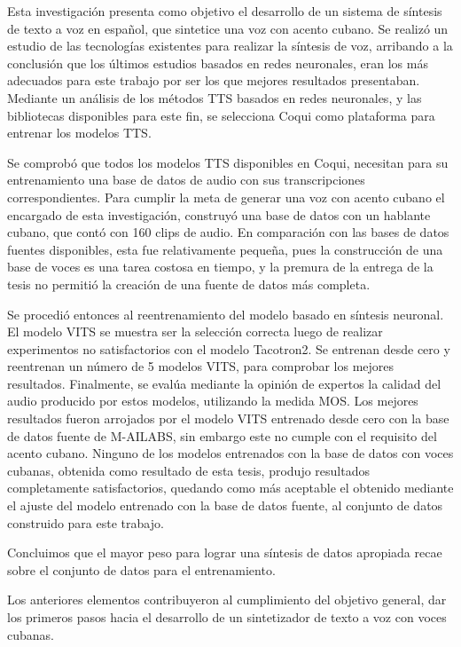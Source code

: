 \begin{conclusions}    
Esta investigación presenta como objetivo el desarrollo de un sistema de síntesis de texto a voz en español, que sintetice una voz con acento cubano. Se realizó un estudio de las tecnologías existentes para realizar la síntesis de voz, arribando a la conclusión que los últimos estudios basados en redes neuronales, eran los más adecuados para este trabajo por ser los que mejores resultados presentaban. Mediante un análisis de los métodos TTS basados en redes neuronales, y las bibliotecas disponibles para este fin, se selecciona Coqui como plataforma para entrenar los modelos TTS. 

Se comprobó que todos los modelos TTS disponibles en Coqui, necesitan para su entrenamiento una base de datos de audio con sus transcripciones correspondientes. Para cumplir la meta de generar una voz con acento cubano el encargado de esta investigación, construyó una base de datos con un hablante cubano, que contó con 160 clips de audio. En comparación con las bases de datos fuentes disponibles, esta fue relativamente pequeña, pues la construcción de una base de voces es una tarea costosa en tiempo, y la premura de la entrega de la tesis no permitió la creación de una fuente de datos más completa.

Se procedió entonces al reentrenamiento del modelo basado en síntesis neuronal. El modelo VITS se muestra ser la selección correcta luego de realizar experimentos no satisfactorios con el modelo Tacotron2. Se entrenan desde cero y reentrenan un número de 5 modelos VITS, para comprobar los mejores resultados. Finalmente, se evalúa mediante la opinión de expertos la calidad del audio producido por estos modelos, utilizando la medida MOS. Los mejores resultados fueron arrojados por el modelo VITS entrenado desde cero con la base de datos fuente de M-AILABS, sin embargo este no cumple con el requisito del acento cubano. Ninguno de los modelos entrenados con la base de datos con voces cubanas, obtenida como resultado de esta tesis, produjo resultados completamente satisfactorios, quedando como más aceptable el obtenido mediante el ajuste del modelo entrenado con la base de datos fuente, al conjunto de datos construido para este trabajo.
 
Concluimos que el mayor peso para lograr una síntesis de datos apropiada recae sobre el conjunto de datos para el entrenamiento.

Los anteriores elementos contribuyeron al cumplimiento del objetivo general, dar los primeros pasos hacia el desarrollo de un sintetizador de texto a voz con voces cubanas. 
    
    
   
\end{conclusions}
